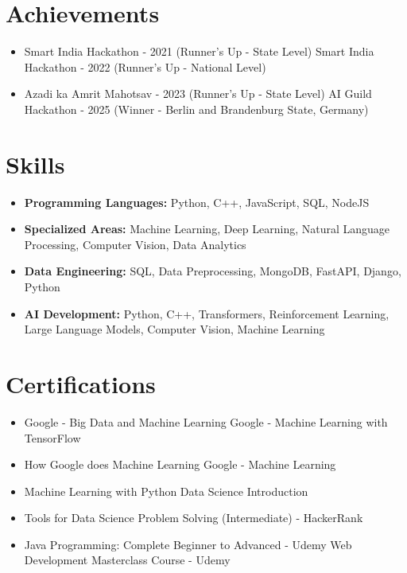 \documentclass[a4paper,10pt]{article}
\begin{document}
\section*{Achievements}
\begin{itemize}
\item Smart India Hackathon - 2021 (Runner's Up - State Level) \hfill Smart India Hackathon - 2022 (Runner's Up - National Level)
\item Azadi ka Amrit Mahotsav - 2023 (Runner's Up - State Level) \hfill AI Guild Hackathon - 2025 (Winner - Berlin and Brandenburg State, Germany)
\end{itemize}

\section*{Skills}
\begin{itemize}
  \item \textbf{Programming Languages:} Python, C++, JavaScript, SQL, NodeJS
  \item \textbf{Specialized Areas:} Machine Learning, Deep Learning, Natural Language Processing, Computer Vision, Data Analytics
  \item \textbf{Data Engineering:} SQL, Data Preprocessing, MongoDB, FastAPI, Django, Python
  \item \textbf{AI Development:} Python, C++, Transformers, Reinforcement Learning, Large Language Models, Computer Vision, Machine Learning
\end{itemize}

\section*{Certifications}
\begin{itemize}
\item Google - Big Data and Machine Learning \hfill Google - Machine Learning with TensorFlow
\item How Google does Machine Learning \hfill Google - Machine Learning
\item Machine Learning with Python \hfill Data Science Introduction
\item Tools for Data Science \hfill Problem Solving (Intermediate) - HackerRank
\item Java Programming: Complete Beginner to Advanced - Udemy \hfill Web Development Masterclass Course - Udemy
\end{itemize}
\end{document}
